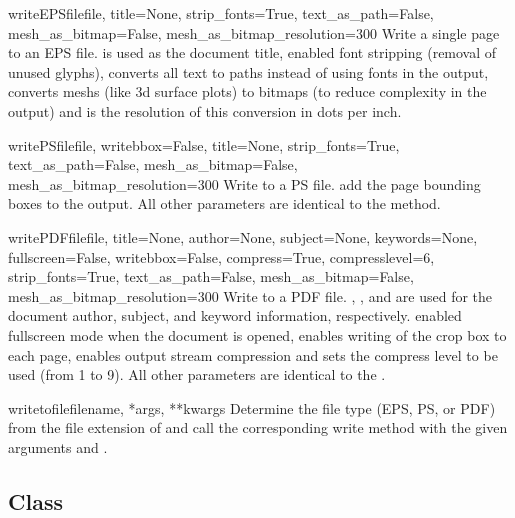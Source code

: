 \begin{methoddesc}{writeEPSfile}{file, title=None, strip_fonts=True,
  text_as_path=False, mesh_as_bitmap=False, mesh_as_bitmap_resolution=300}
  Write a single page  to an EPS file. 
  is used as the document title,  enabled font
  stripping (removal of unused glyphs),  converts
  all text to paths instead of using fonts in the output,
   converts meshs (like 3d surface plots) to
  bitmaps (to reduce complexity in the output) and
   is the resolution of this conversion
  in dots per inch.
\end{methoddesc}

\begin{methoddesc}{writePSfile}{file, writebbox=False, title=None, strip_fonts=True,
  text_as_path=False, mesh_as_bitmap=False, mesh_as_bitmap_resolution=300}
  Write  to a PS file.  add the page
  bounding boxes to the output. All other parameters are identical to
  the  method.
\end{methoddesc}

\begin{methoddesc}{writePDFfile}{file, title=None, author=None, subject=None,
keywords=None, fullscreen=False, writebbox=False, compress=True, compresslevel=6,
strip_fonts=True, text_as_path=False, mesh_as_bitmap=False, mesh_as_bitmap_resolution=300}
  Write  to a PDF file. , ,
  and  are used for the document author, subject, and
  keyword information, respectively.  enabled
  fullscreen mode when the document is opened,  enables
  writing of the crop box to each page,  enables output
  stream compression and  sets the compress level
  to be used (from 1 to 9). All other parameters are identical to the
  .
\end{methoddesc}

\begin{methoddesc}{writetofile}{filename, *args, **kwargs}
  Determine the file type (EPS, PS, or PDF) from the file extension
  of  and call the corresponding write method with
  the given arguments  and .
\end{methoddesc}

\subsection{Class }

